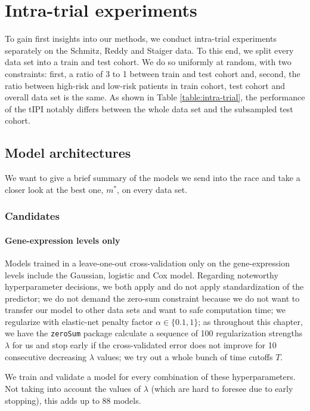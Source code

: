 \section{Intra-trial experiments}

To gain first insights into our methods, we conduct intra-trial experiments separately on the 
Schmitz, Reddy and Staiger data. To this end, we split every data set into a train and test 
cohort. We do so uniformly at random, with two constraints: first, a ratio of 3 to 1 between train 
and test cohort and, second, the ratio between high-risk and low-risk patients in train cohort, 
test cohort and overall data set is the same. As shown in Table \ref{table:intra-trial}, the 
performance of the tIPI notably differs between the whole data set and the subsampled test cohort. 



\subsection{Model architectures}

We want to give a brief summary of the models we send into the race and take a closer look at the 
best one, $m^*$, on every data set.

\subsubsection{Candidates}

\paragraph{Gene-expression levels only}
Models trained in a leave-one-out cross-validation only on the gene-expression levels include the 
Gaussian, logistic and Cox model. Regarding noteworthy hyperparameter decisions, we both apply and 
do not apply standardization of the predictor; we do not demand the zero-sum constraint 
because we do not want to transfer our model to other data sets and want to safe computation time;
we regularize with elastic-net penalty factor $\alpha \in \{ \num{0.1}, 1 \}$; as throughout this 
chapter, we have the \texttt{zeroSum} package calculate a sequence of \num{100} regularization strengths 
$\lambda$ for us and stop early if the cross-validated error does not improve for \num{10} 
consecutive decreasing $\lambda$ values; we try out a whole bunch of time cutoffs $T$.

We train and validate a model for every combination of these hyperparameters.
Not taking into account the values of $\lambda$ (which are hard to foresee due to early stopping), 
this adds up to \num{88} models.

